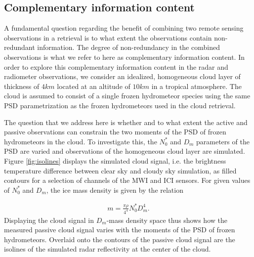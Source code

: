 \documentclass[journal abbreviation, manuscript]{copernicus}
\begin{document}
\subsection{Complementary information content}
\label{sec:orgdc1b0b8}

A fundamental question regarding the benefit of combining two remote sensing
observations in a retrieval is to what extent the observations contain
non-redundant information. The degree of non-redundancy in the combined
observations is what we refer to here as complementary information content. In
order to explore this complementary information content in the radar and radiometer
observations, we consider an idealized, homogeneous cloud layer of thickness of
$4\unit{km}$ located at an altitude of $10\unit{km}$ in a
tropical atmosphere. The cloud is assumed to consist of a single frozen
hydrometeor species using the same PSD parametrization as the frozen
hydrometeors used in the cloud retrieval.

The question that we address here is whether and to what extent the active and
passive observations can constrain the two moments of the PSD of frozen
hydrometeors in the cloud. To investigate this, the $N_0^*$ and $D_m$ parameters
of the PSD are varied and observations of the homogeneous cloud layer are
simulated. Figure \ref{fig:isolines} displays the simulated cloud signal,
i.e. the brightness temperature difference between clear sky and cloudy sky
simulation, as filled contours for a selection of channels of the MWI and ICI
sensors. For given values of $N_0^*$ and $D_m$, the ice mass density is given by
the relation

\begin{align}
m = \frac{\pi \rho}{4 ^ 4}N_0^* D_m^4.
\end{align}
Displaying the cloud signal in $D_m$-mass density space thus shows how the
measured passive cloud signal varies with the moments of the PSD of frozen
hydrometeors. Overlaid onto the contours of the passive cloud signal are
the isolines of the simulated radar reflectivity at the center of the cloud.
\end{document}
